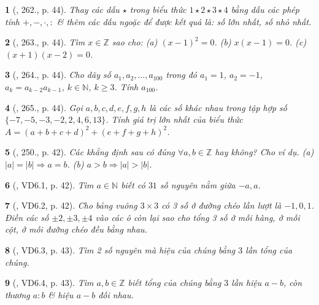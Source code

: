 \documentclass{article}
\newtheorem{baitoan}{}
\begin{document}
\begin{baitoan}[\cite{Binh_Toan_6_tap_1}, 262., p. 44]
	Thay các dấu  $\star$ trong biểu thức $1\star2\star3\star4$ bằng dấu các phép tính $+,-,\cdot,:$ \& thêm các dấu ngoặc để được kết quả là: số lớn nhất, số nhỏ nhất.
\end{baitoan}

\begin{baitoan}[\cite{Binh_Toan_6_tap_1}, 263., p. 44]
	Tìm $x\in\mathbb{Z}$ sao cho: (a) $(x - 1)^2 = 0$. (b) $x(x - 1) = 0$. (c) $(x + 1)(x - 2) = 0$.
\end{baitoan}

\begin{baitoan}[\cite{Binh_Toan_6_tap_1}, 264., p. 44]
	Cho dãy số $a_1,a_2,\ldots,a_{100}$ trong đó $a_1 = 1$, $a_2 = -1$, $a_k = a_{k-2}a_{k-1}$, $k\in\mathbb{N}$, $k\ge 3$. Tính $a_{100}$.
\end{baitoan}

\begin{baitoan}[\cite{Binh_Toan_6_tap_1}, 265., p. 44]
	Gọi $a,b,c,d,e,f,g,h$ là các số khác nhau trong tập hợp số $\{-7,-5,-3,-2,2,4,6,13\}$. Tính giá trị lớn nhất của biểu thức $A = (a + b + c + d)^2 + (e + f + g + h)^2$.
\end{baitoan}

\begin{baitoan}[\cite{Binh_Toan_6_tap_1}, 250., p. 42]
	Các khẳng định sau có đúng $\forall a,b\in\mathbb{Z}$ hay không? Cho ví dụ. (a) $|a| = |b|\Rightarrow a = b$. (b) $a > b\Rightarrow|a| > |b|$.	
\end{baitoan}

\begin{baitoan}[\cite{TLCT_THCS_Toan_6_so_hoc}, VD6.1, p. 42]
	Tìm $a\in\mathbb{N}$ biết có $31$ số nguyên nằm giữa $-a,a$.
\end{baitoan}

\begin{baitoan}[\cite{TLCT_THCS_Toan_6_so_hoc}, VD6.2, p. 42]
	Cho bảng vuông $3\times3$ có 3 số ở đường chéo lần lượt là $-1,0,1$. Điền các số $\pm2,\pm3,\pm4$ vào các ô còn lại sao cho tổng 3 số ở mỗi hàng, ở mỗi cột, ở mỗi đường chéo đều bằng nhau.
\end{baitoan}

\begin{baitoan}[\cite{TLCT_THCS_Toan_6_so_hoc}, VD6.3, p. 43]
	Tìm 2 số nguyên mà hiệu của chúng bằng $3$ lần tổng của chúng.
\end{baitoan}

\begin{baitoan}[\cite{TLCT_THCS_Toan_6_so_hoc}, VD6.4, p. 43]
	Tìm $a,b\in\mathbb{Z}$ biết tổng của chúng bằng $3$ lần hiệu $a - b$, còn thương $a:b$ \& hiệu $a - b$ đối nhau.
\end{baitoan}
\end{document}
